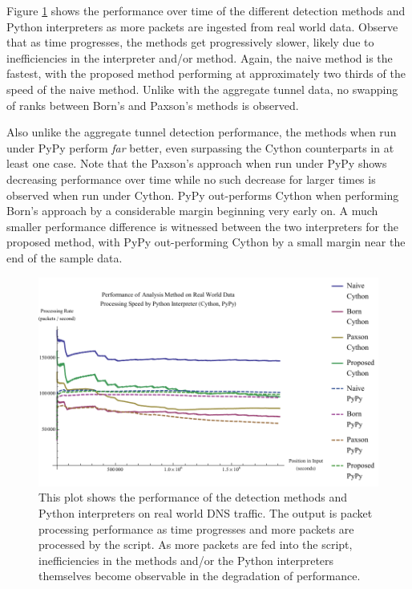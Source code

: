 \documentclass[12pt]{report}
\theoremstyle{remark}
\theoremstyle{definition}
\theoremstyle{definition}
\theoremstyle{definition}
\begin{document}
Figure \ref{pmqr} shows the performance over time of the different detection
methods and Python interpreters as more packets are ingested from real world
data. Observe that as time progresses, the methods get progressively slower,
likely due to inefficiencies in the interpreter and/or method. Again, the naive
method is the fastest, with the proposed method performing at approximately two
thirds of the speed of the naive method. Unlike with the aggregate tunnel data,
no swapping of ranks between Born's and Paxson's methods is observed.

Also unlike the aggregate tunnel detection performance, the methods when run
under PyPy perform \emph{far} better, even surpassing the Cython counterparts in
at least one case. Note that the Paxson's approach when run under PyPy shows
decreasing performance over time while no such decrease for larger times is
observed when run under Cython. PyPy out-performs Cython when performing Born's
approach by a considerable margin beginning very early on. A much smaller
performance difference is witnessed between the two interpreters for the
proposed method, with PyPy out-performing Cython by a small margin near the end
of the sample data.

\begin{figure}
\centering
\includegraphics[width=\textwidth]{figures/pmqr.pdf}
\caption[Performance of Analysis Method and Python Interpreter on Real World
Data]{This plot shows the performance of the detection methods and Python
interpreters on real world DNS traffic. The output is packet processing performance as time
progresses and more packets are processed by the script. As more packets are fed
into the script, inefficiencies in the methods and/or the Python interpreters
themselves become observable in the degradation of performance.}
\label{pmqr}
\end{figure}
\end{document}
